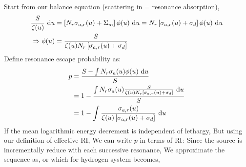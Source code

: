 \documentclass{school-22.211-notes}
\begin{document}
Start from our balance equation (scattering in = resonance absorption),
\begin{align}
\frac{S}{\zeta(u)} \mbox{ }\mathrm{d} u &= \left[ N_r \sigma_{a,r} (u) + \Sigma_m \right] \phi(u) \mbox{ }\mathrm{d} u = N_r \left[ \sigma_{a,r} (u) + \sigma_d \right] \phi(u) \mbox{ }\mathrm{d} u \\
\Rightarrow \phi(u) &= \frac{S}{\zeta(u) N_r \left[ \sigma_{a,r} (u) + \sigma_d \right] } 
\end{align}
Define resonance escape probability as:
\begin{align}
p &= \frac{S - \int N_r \sigma_a(u) \phi(u) \mbox{ }\mathrm{d} u}{S} \\
&= 1 - \frac{\int N_r \sigma_a(u) \frac{S}{\zeta(u) N_r \left[ \sigma_{a,r} (u) + \sigma_d \right] } \mbox{ }\mathrm{d} u }{S} \\
&= 1 - \int \frac{\sigma_{a,r} (u) }{\zeta(u) \left[ \sigma_{a,r} (u) + \sigma_d \right] } \mbox{ }\mathrm{d} u
\end{align}
If the mean logarithmic energy decrement is independent of lethargy, 
But using our definition of effective RI,
We can write $p$ in terms of $\mathrm{RI}$:
Since the source is incrementally reduce with each successive resonance,
We approximate the sequence as,
or
which for hydrogen system becomes, 
\end{document}
